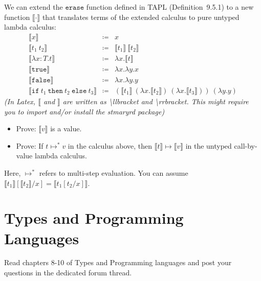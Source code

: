 We can extend the $\mathtt{erase}$ function defined in TAPL (Definition~9.5.1) to a new function $\llbracket\cdot\rrbracket$
that translates terms of the extended calculus to pure untyped lambda calculus: 
\begin{align*}
  \llbracket x \rrbracket &\coloneq & x \\
  \llbracket t_1~t_2 \rrbracket &\coloneq&  \llbracket t_1 \rrbracket~\llbracket t_2 \rrbracket \\
  \llbracket \lambda x:T . t \rrbracket &\coloneq& \lambda x. \llbracket t \rrbracket \\
  \llbracket \mathtt{true}\rrbracket &\coloneq& \lambda{x}.\lambda{y}.x \\
  \llbracket \mathtt{false}\rrbracket &\coloneq& \lambda{x}.\lambda{y}.y \\
  \llbracket \mathtt{if}~t_1~\mathtt{then}~t_2~\mathtt{else}~t_3 \rrbracket &\coloneq& (\llbracket t_1 \rrbracket~(\lambda{x}.\llbracket t_2 \rrbracket)~(\lambda{x}.\llbracket t_3 \rrbracket))~(\lambda{y}.y)
\end{align*}
\emph{(In Latex, $\llbracket$ and $\rrbracket$ are written as \textbackslash llbracket and \textbackslash rrbracket. 
This might require you to import and/or install the stmaryrd package)}

\begin{itemize}
  \item Prove: $\llbracket v \rrbracket$ is a value.
  \item Prove: If $t \mapsto^* v$ in the calculus above, then $\llbracket t\rrbracket \mapsto \llbracket v\rrbracket$
      in the untyped call-by-value lambda calculus.
\end{itemize}
Here, $\mapsto^*$ refers to multi-step evaluation.
You can assume $\llbracket t_1 \rrbracket [\llbracket t_2\rrbracket /x] = \llbracket t_1[t_2/x]\rrbracket$.

\section{Types and Programming Languages}
Read chapters 8-10 of Types and Programming languages and post your questions in the dedicated forum thread.
